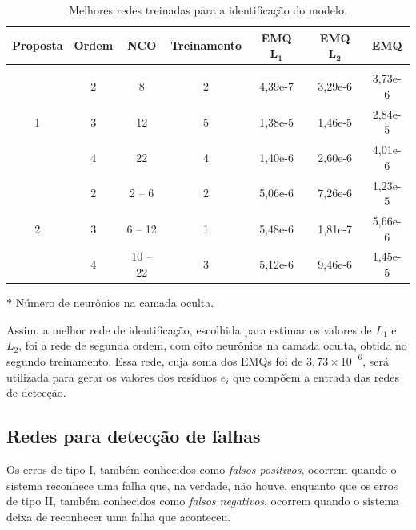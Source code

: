 \begin{table}[htb]
\small
\centering
\caption{Melhores redes treinadas para a identificação do modelo.}
\label{tab:melhores_rnas_ident}
\vspace{0.25cm}
\begin{threeparttable}
\begin{tabular}{|c|c|c|c|c|c|c|}
\hline
{\bf Proposta} & 
{\bf Ordem} & 
{\bf NCO\tnote{$*$}} & 
{\bf Treinamento} &
{\bf EMQ $\mathbf{L_1}$} & 
{\bf EMQ $\mathbf{L_2}$} & 
{\bf EMQ}\\
\hline
\hhline\\
\multirow{3}{*}{1} &
\cellcolor[gray]{0.85}2 &
\cellcolor[gray]{0.85}8 &
\cellcolor[gray]{0.85}2 &
\cellcolor[gray]{0.85}4,39e-7 &
\cellcolor[gray]{0.85}3,29e-6 &
\cellcolor[gray]{0.85}3,73e-6\\
\hhline{~------}
&3 & 12 & 5 & 1,38e-5 & 1,46e-5 & 2,84e-5\\
\cline{2-7}
&4 & 22 & 4 & 1,40e-6 & 2,60e-6 & 4,01e-6\\
\hline
\multirow{3}{*}{2} & 2 & 2 -- 6 & 2 & 5,06e-6 & 7,26e-6 & 1,23e-5\\
\cline{2-7}
& 3 & 6 -- 12 & 1 & 5,48e-6 & 1,81e-7 & 5,66e-6\\
\cline{2-7}
& 4 & 10 -- 22 & 3 & 5,12e-6 & 9,46e-6 & 1,45e-5\\
\hline
\end{tabular}
\begin{tablenotes}
\item [$*$] Número de neurônios na camada oculta.
\end{tablenotes}
\end{threeparttable}
\end{table}

Assim, a melhor rede de identificação, escolhida para estimar os valores de
$L_1$ e $L_2$, foi a rede de segunda ordem, com oito neurônios na camada oculta,
obtida no segundo treinamento. Essa rede, cuja soma dos EMQs foi de $3,73 \times
10^{-6}$, será utilizada para gerar os valores dos resíduos $e_i$
que compõem a entrada das redes de detecção.

\subsection{Redes para detecção de falhas}
Os erros de tipo I, também conhecidos como {\it falsos positivos}, ocorrem
quando o sistema reconhece uma falha que, na verdade, não houve, enquanto que os
erros de tipo II, também conhecidos como {\it falsos negativos}, ocorrem quando
o sistema deixa de reconhecer uma falha que aconteceu.


